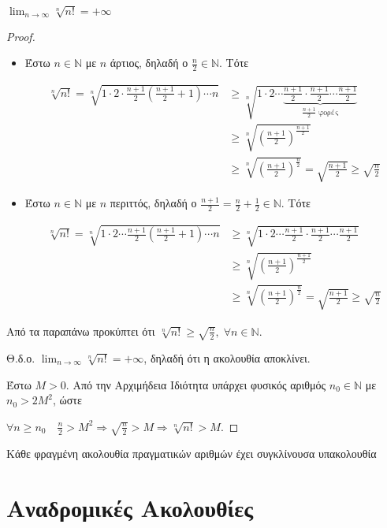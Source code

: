 \documentclass[main.tex]{subfiles}
\begin{document}
\begin{prop}
    $ \lim_{n \to \infty} \sqrt[n]{n!} = +\infty $ 
\end{prop}


\begin{proof}
\item {}
    \begin{itemize}
        \item 
    Έστω $ n \in \mathbb{N} $ με $ n $ άρτιος, δηλαδή ο $ \frac{n}{2} \in
    \mathbb{N} $. Τότε

    \begin{align*}
        \sqrt[n]{n!} = \sqrt[n]{1 \cdot 2 \cdot \frac{n+1}{2}
            \left(\frac{n+1}{2} +1\right) \cdots n} &\geq \sqrt[n]{1\cdot 2 \cdots
            \underbrace{\frac{n+1}{2} \cdot \frac{n+1}{2} \cdots \frac{n+1}{2}}_{
        \frac{n+1}{2} \; \text{φορές}}} \\
&\geq
\sqrt[n]{\left(\frac{n+1}{2}\right)^{\frac{n+1}{2}}} \\ 
&\geq \sqrt[n]{\left(\frac{n+1}{2}\right)^{\frac{n}{2}}} =
\sqrt{ \frac{n+1}{2} } \geq \sqrt{\frac{n}{2}} 
     \end{align*} 

 \item Έστω $ n \in \mathbb{N} $ με $ n $ περιττός, δηλαδή ο $
     \frac{n+1}{2} = \frac{n}{2} + \frac{1}{2} \in \mathbb{N}  $. Τότε

     \begin{align*}
         \sqrt[n]{n!} = \sqrt[n]{1\cdot 2 \cdots \frac{n+1}{2}
             \left(\frac{n+1}{2} +1\right) \cdots n}
             &\geq \sqrt[n]{1 \cdot 2 \cdots
     \frac{n+1}{2}  \cdot \frac{n+1}{2} \cdots \frac{n+1}{2} } \\ 
             &\geq 
     \sqrt[n]{\left(\frac{n+1}{2} \right)^{\frac{n+1}{2}}} \\ 
             & \geq
     \sqrt[n]{\left(\frac{n+1}{2} \right)^{\frac{n}{2}}} = \sqrt{\frac{n+1}{2}} \geq 
     \sqrt{\frac{n}{2}}
     \end{align*}
    \end{itemize}

    Από τα παραπάνω προκύπτει ότι $ \sqrt[n]{n!} \geq \sqrt{\frac{n}{2}
    }, \; \forall n \in \mathbb{N} $. 

    Θ.δ.ο. $ \lim_{n \to \infty} \sqrt[n]{n!} = + \infty $, δηλαδή ότι 
    η ακολουθία αποκλίνει.

    Έστω $ M >0 $. Από την Αρχιμήδεια Ιδιότητα υπάρχει φυσικός αριθμός $ 
    n_{0} \in  \mathbb{N} $ με $ n_{0}>2M^{2} $, ώστε 

    $ \forall n \geq n_{0} \quad \frac{n}{2} > M^{2} \Rightarrow
    \sqrt{\frac{n}{2}} > M \Rightarrow \sqrt[n]{n!} > M $. 
\end{proof}

\begin{thm}
    Κάθε φραγμένη ακολουθία πραγματικών αριθμών έχει συγκλίνουσα υπακολουθία
\end{thm}



\section{Αναδρομικές Ακολουθίες}
\end{document}
